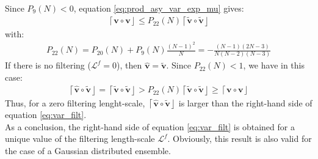 \documentclass[12pt]{scrartcl}
\begin{document}
Since $P_9(N) < 0$, equation \eqref{eq:prod_asy_var_exp_mu} gives:
\begin{align}
\left\lceil \mathbf{v} \circ \mathbf{v} \right\rfloor \le P_{22}(N) \left\lceil\widetilde{\mathbf{v}} \circ \widetilde{\mathbf{v}}\right\rfloor
\end{align}
with:
\begin{align}
P_{22}(N) = P_{20}(N) + P_9(N) \frac{(N-1)^2}{N} = -\frac{(N-1)(2N-3)}{N(N-2)(N-3)}
\end{align}
If there is no filtering ($\mathcal{L}^f=0$), then $\widehat{\mathbf{v}} = \widetilde{\mathbf{v}}$. Since $P_{22}(N) < 1$, we have in this case:
\begin{align}
\left\lceil\widehat{\mathbf{v}} \circ \widetilde{\mathbf{v}}\right\rfloor = \left\lceil\widetilde{\mathbf{v}} \circ \widetilde{\mathbf{v}}\right\rfloor > P_{22}(N) \left\lceil\widetilde{\mathbf{v}} \circ \widetilde{\mathbf{v}}\right\rfloor \ge \left\lceil \mathbf{v} \circ \mathbf{v} \right\rfloor
\end{align}
Thus, for a zero filtering lenght-scale, $\left\lceil\widehat{\mathbf{v}} \circ \widetilde{\mathbf{v}}\right\rfloor$ is larger than the right-hand side of equation \eqref{eq:var_filt}.\\
$  $\\
As a conclusion, the right-hand side of equation \eqref{eq:var_filt} is obtained for a unique value of the filtering length-scale $\mathcal{L}^f$. Obviously, this result is also valid for the case of a Gaussian distributed ensemble.
\end{document}
